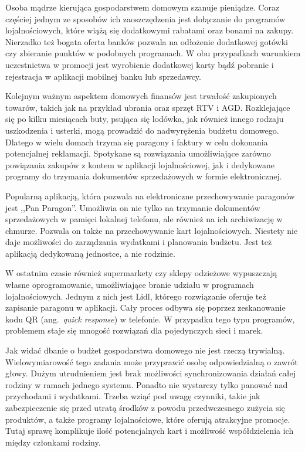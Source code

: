 Osoba mądrze kierująca gospodarstwem domowym szanuje pieniądze. Coraz częściej jednym ze sposobów ich zaoszczędzenia jest dołączanie do programów lojalnościowych, które wiążą się dodatkowymi rabatami oraz bonami na zakupy. Nierzadko też bogata oferta banków pozwala na odłożenie dodatkowej gotówki czy zbieranie punktów w podobnych programach. W obu przypadkach warunkiem uczestnictwa w promocji jest wyrobienie dodatkowej karty bądź pobranie i rejestracja w aplikacji mobilnej banku lub sprzedawcy.

Kolejnym ważnym aspektem domowych finansów jest trwałość zakupionych towarów, takich jak na przykład ubrania oraz sprzęt RTV i AGD. Rozklejające się po kilku miesiącach buty, psująca się lodówka, jak również innego rodzaju uszkodzenia i usterki, mogą prowadzić do nadwyrężenia budżetu domowego. Dlatego w wielu domach trzyma się paragony i faktury w celu dokonania potencjalnej reklamacji. Spotykane są rozwiązania umożliwiające zarówno powiązania zakupów z kontem w aplikacji lojalnościowej, jak i dedykowane programy do trzymania dokumentów sprzedażowych w formie elektronicznej.

Popularną aplikacją, która pozwala na elektroniczne przechowywanie paragonów jest ,,Pan Paragon''. Umożliwia on nie tylko na trzymanie dokumentów sprzedażowych w pamięci lokalnej telefonu, ale również na ich archiwizację w chmurze. Pozwala on także na przechowywanie kart lojalnościowych. Niestety nie daje możliwości do zarządzania wydatkami i planowania budżetu. Jest też aplikacją dedykowaną jednostce, a nie rodzinie.

W ostatnim czasie również supermarkety czy sklepy odzieżowe wypuszczają własne oprogramowanie, umożliwiające branie udziału w programach lojalnościowych. Jednym z nich jest Lidl, którego rozwiązanie oferuje też zapisanie paragonu w aplikacji. Cały proces odbywa się poprzez zeskanowanie kodu QR (ang.~\emph{quick response}) w telefonie. W przypadku tego typu programów, problemem staje się mnogość rozwiązań dla pojedynczych sieci i marek.

Jak widać dbanie o budżet gospodarstwa domowego nie jest rzeczą trywialną. Wielowymiarowość tego zadania może przyprawić osobę odpowiedzialną o zawrót głowy. Dużym utrudnieniem jest brak możliwości synchronizowania działań całej rodziny w ramach jednego systemu. Ponadto nie wystarczy tylko panować nad przychodami i wydatkami. Trzeba wziąć pod uwagę czynniki, takie jak zabezpieczenie się przed utratą środków z powodu przedwczesnego zużycia się produktów, a także  programy lojalnościowe, które oferują atrakcyjne promocje. Tutaj sprawę komplikuje ilość potencjalnych kart i możliwość współdzielenia ich między członkami rodziny. 

